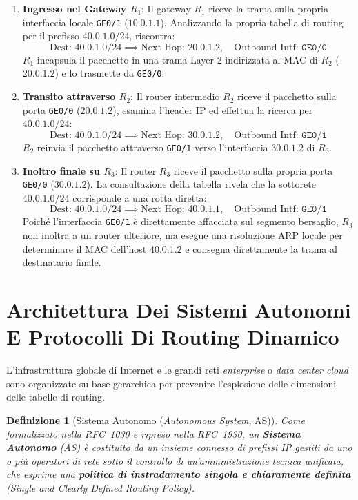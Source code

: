 \documentclass[11pt, a4paper]{article}
\newtheorem{theorem}{Definizione}
\begin{document}
\begin{enumerate}
    \item \textbf{Ingresso nel Gateway $R_1$}: Il gateway $R_1$ riceve la trama sulla propria interfaccia locale \texttt{GE0/1} ($10.0.1.1$). Analizzando la propria tabella di routing per il prefisso $40.0.1.0/24$, riscontra:
    \[
        \text{Dest: } 40.0.1.0/24 \implies \text{Next Hop: } 20.0.1.2, \quad \text{Outbound Intf: } \texttt{GE0/0}
    \]
    $R_1$ incapsula il pacchetto in una trama Layer 2 indirizzata al MAC di $R_2$ ($20.0.1.2$) e lo trasmette da \texttt{GE0/0}.

    \item \textbf{Transito attraverso $R_2$}: Il router intermedio $R_2$ riceve il pacchetto sulla porta \texttt{GE0/0} ($20.0.1.2$), esamina l'header IP ed effettua la ricerca per $40.0.1.0/24$:
    \[
        \text{Dest: } 40.0.1.0/24 \implies \text{Next Hop: } 30.0.1.2, \quad \text{Outbound Intf: } \texttt{GE0/1}
    \]
    $R_2$ reinvia il pacchetto attraverso \texttt{GE0/1} verso l'interfaccia $30.0.1.2$ di $R_3$.

    \item \textbf{Inoltro finale su $R_3$}: Il router $R_3$ riceve il pacchetto sulla propria porta \texttt{GE0/0} ($30.0.1.2$). La consultazione della tabella rivela che la sottorete $40.0.1.0/24$ corrisponde a una rotta diretta:
    \[
        \text{Dest: } 40.0.1.0/24 \implies \text{Next Hop: } 40.0.1.1, \quad \text{Outbound Intf: } \texttt{GE0/1}
    \]
    Poiché l'interfaccia \texttt{GE0/1} è direttamente affacciata sul segmento bersaglio, $R_3$ non inoltra a un router ulteriore, ma esegue una risoluzione ARP locale per determinare il MAC dell'host $40.0.1.2$ e consegna direttamente la trama al destinatario finale.
\end{enumerate}

\newpage

\section{Architettura Dei Sistemi Autonomi E Protocolli Di Routing Dinamico}

L'infrastruttura globale di Internet e le grandi reti \emph{enterprise} o \emph{data center cloud} sono organizzate su base gerarchica per prevenire l'esplosione delle dimensioni delle tabelle di routing.

\begin{theorem}[Sistema Autonomo (\emph{Autonomous System}, AS)]
Come formalizzato nella RFC~1030 e ripreso nella RFC~1930, un \textbf{Sistema Autonomo} (AS) è costituito da un insieme connesso di prefissi IP gestiti da uno o più operatori di rete sotto il controllo di un'amministrazione tecnica unificata, che esprime una \textbf{politica di instradamento singola e chiaramente definita} (\emph{Single and Clearly Defined Routing Policy}).
\end{theorem}
\end{document}
